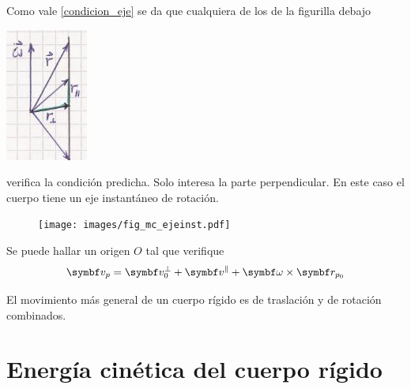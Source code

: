 \documentclass[10pt,oneside]{CBFT_book}
\begin{document}
Como vale \eqref{condicion_eje} se da que cualquiera de los  de la figurilla debajo

\includegraphics[scale=0.4]{images/fig_mc_rigid_body_ejerot2.jpg}

verifica la condición predicha. Solo interesa la parte perpendicular.
En este caso el cuerpo tiene un eje instantáneo de rotación.

\begin{figure}[htb]
	\begin{center}
	\texttt{[image: images/fig\_mc\_ejeinst.pdf]}	 
	\end{center}
	\caption{}
\end{figure} 

Se puede hallar un origen $O$ tal que verifique 
\[
	\vb{v}_p = \vb{v}_0^\perp + \vb{v}^\parallel + \vb{\omega} \times \vb{r}_{p_0}  
\]

El movimiento más general de un cuerpo rígido es de traslación y de rotación combinados.

\section{Energía cinética del cuerpo rígido}
\end{document}

